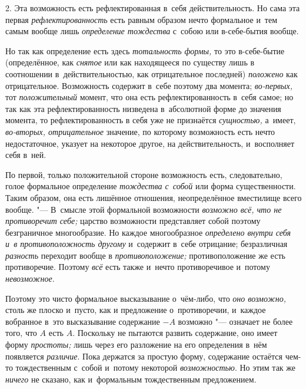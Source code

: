 2. Эта возможность есть рефлектированная в~себя действительность. Но сама
эта первая {\em рефлектированность} есть равным образом
нечто формальное и~тем самым вообще лишь
{\em определение тождества} с~собою или в-себе-бытия вообще.

Но так как определение есть здесь {\em тотальность
формы,} то это в-себе-бытие (определённое, как
{\em снятое} или как находящееся по существу лишь в
соотношении в~действительностью, как отрицательное последней)
{\em положено} как отрицательное. Возможность содержит
в~себе поэтому два момента; {\em во-первых,} тот
{\em положительный} момент, что она есть
рефлектированность в~себя самое; но так как эта рефлектированность
низведена в~абсолютной форме до значения момента, то рефлектированность в
себя уже не признаётся {\em сущностью,} а~имеет,
{\em во-вторых, отрицательное} значение, по которому возможность
есть нечто недостаточное, указует на некоторое другое, на действительность,
и~восполняет себя в~ней.

По первой, только положительной стороне возможность есть, следовательно,
голое формальное определение {\em тождества с~собой}
или форма существенности. Таким образом, она есть лишённое отношения,
неопределённое вместилище всего вообще. "--- В~смысле этой формальной
возможности {\em возможно всё, что не противоречит
себе;} царство возможности представляет собой поэтому безграничное
многообразие. Но каждое многообразное {\em определено
внутри себя и~в противоположность другому} и~содержит в~себе отрицание;
безразличная {\em разность} переходит вообще в
{\em противоположение;} противоположение же есть
противоречие. Поэтому {\em всё} есть также и~нечто
противоречивое и~потому {\em невозможное}.

Поэтому это чисто формальное высказывание о~чём-либо, что
{\em оно возможно,} столь же плоско и~пусто, как и
предложение о~противоречии, и~каждое вобранное в~это высказывание
содержание $-A$ возможно "--- означает не более того, что $A$
есть $A$. Поскольку не пытаются развить содержание, оно имеет форму
{\em простоты;} лишь через его разложение на его
определения в~нём появляется {\em различие}. Пока
держатся за простую форму, содержание остаётся чем-то тождественным с~собой
и~потому некоторой {\em возможностью}. Но этим так же
{\em ничего} не сказано, как и~формальным тождественным
предложением.


